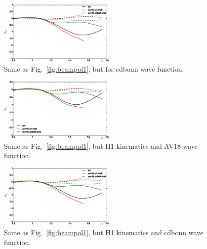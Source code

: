 \begin{figure}[htb]
\begin{center}
  \includegraphics[width=0.5\textwidth]{figs/beampol_cdbonn_kin1.eps}
\caption{Same as Fig.~\ref{fig:beampol1}, but for cdbonn wave function.}
\label{fig:beampol2}       %
\end{center}
\end{figure}

\begin{figure}[htb]
\begin{center}
  \includegraphics[width=0.5\textwidth]{figs/beampol_av18_kin1.eps}
\caption{Same as Fig.~\ref{fig:beampol1}, but H1 kinematics and AV18 wave 
function.}
\label{fig:beampol3}       %
\end{center}
\end{figure}

\begin{figure}[htb]
\begin{center}
  \includegraphics[width=0.5\textwidth]{figs/beampol_cdbonn_kin1.eps}
\caption{Same as Fig.~\ref{fig:beampol1}, but H1 kinematics and cdbonn wave 
function.}
\label{fig:beampol4}       %
\end{center}
\end{figure}
\fi

